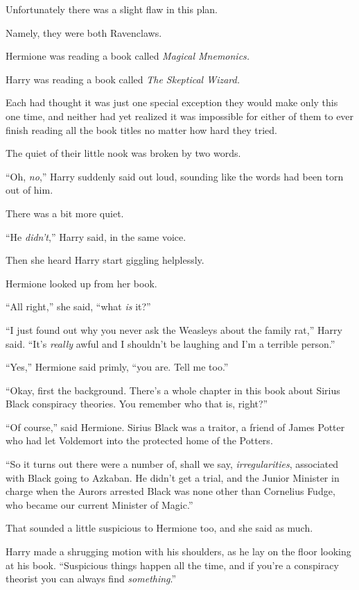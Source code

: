 Unfortunately there was a slight flaw in this plan.

Namely, they were both Ravenclaws.

Hermione was reading a book called \emph{Magical Mnemonics.}

Harry was reading a book called \emph{The Skeptical Wizard.}

Each had thought it was just one special exception they would make only this one time, and neither had yet realized it was impossible for either of them to ever finish reading all the book titles no matter how hard they tried.

The quiet of their little nook was broken by two words.

``Oh, \emph{no},'' Harry suddenly said out loud, sounding like the words had been torn out of him.

There was a bit more quiet.

``He \emph{didn't},'' Harry said, in the same voice.

Then she heard Harry start giggling helplessly.

Hermione looked up from her book.

``All right,'' she said, ``what \emph{is} it?''

``I just found out why you never ask the Weasleys about the family rat,'' Harry said. ``It's \emph{really} awful and I shouldn't be laughing and I'm a terrible person.''

``Yes,'' Hermione said primly, ``you are. Tell me too.''

``Okay, first the background. There's a whole chapter in this book about Sirius Black conspiracy theories. You remember who that is, right?''

``Of course,'' said Hermione. Sirius Black was a traitor, a friend of James Potter who had let Voldemort into the protected home of the Potters.

``So it turns out there were a number of, shall we say, \emph{irregularities}, associated with Black going to Azkaban. He didn't get a trial, and the Junior Minister in charge when the Aurors arrested Black was none other than Cornelius Fudge, who became our current Minister of Magic.''

That sounded a little suspicious to Hermione too, and she said as much.

Harry made a shrugging motion with his shoulders, as he lay on the floor looking at his book. ``Suspicious things happen all the time, and if you're a conspiracy theorist you can always find \emph{something}.''

